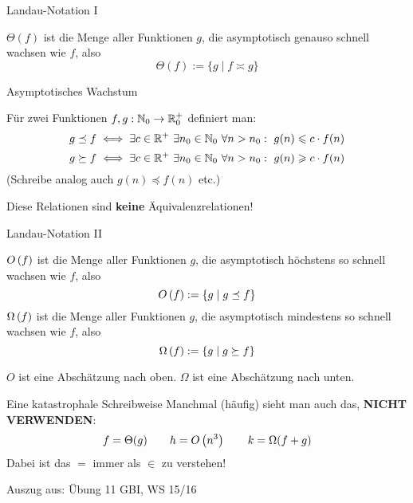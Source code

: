 \begin{frame}{Landau-Notation I}
	\begin{Definition}
		$\Theta(f)$ ist die Menge aller Funktionen $g$, die asymptotisch genauso schnell wachsen wie $f$, also $$\Theta(f) := \{ g \mid f \asymp g \}$$
	\end{Definition}
	
	\medskip
\end{frame}


\begin{frame}{Asymptotisches Wachstum}
	\begin{Definition}
		Für zwei Funktionen $f,g: \mathbb{N}_0 \to \mathbb{R}_0^+$ definiert man:
		$$g \preceq f \Gdw \exists c \in \R^+ \ \exists n_0 \in \N_0 \ \forall n > n_0: \ g(n) \leq c \· f(n)$$
		$$g \succeq f \Gdw \exists c \in \R^+ \ \exists n_0 \in \N_0 \ \forall n > n_0: \ g(n) \geq c \· f(n)$$
		(Schreibe analog auch $g(n) \preceq f(n)$ etc.)
	\end{Definition} \pause
	Diese Relationen sind \textbf{keine} Äquivalenzrelationen!
\end{frame}

\begin{frame}{Landau-Notation II}
	\begin{Definition}
		$O\left(f\right)$ ist die Menge aller Funktionen $g$, die asymptotisch höchstens so schnell wachsen wie $f$, also $$O\left(f\right) := \{ g \mid g \preceq f \}$$
		$\Omega\left(f\right)$ ist die Menge aller Funktionen $g$, die asymptotisch mindestens so schnell wachsen wie $f$, also $$\Omega\left(f\right) := \{ g \mid g \succeq f \}$$
	\end{Definition} \pause
	\impl $O$ ist eine Abschätzung nach oben. $\Omega$ ist eine Abschätzung nach unten.
\end{frame}


\begin{frame}{Eine katastrophale Schreibweise}
	Manchmal (häufig) sieht man auch das, \textbf{NICHT VERWENDEN}:
	$$f = \Theta(g) \qquad h = O\left(n^3\right) \qquad k = \Omega(f + g)$$
	\pause
	Dabei ist das $=$ immer als $\in$ zu verstehen!
\end{frame}

\begin{frame}{}
	Auszug aus:
	Übung 11 GBI, WS 15/16
\end{frame}



